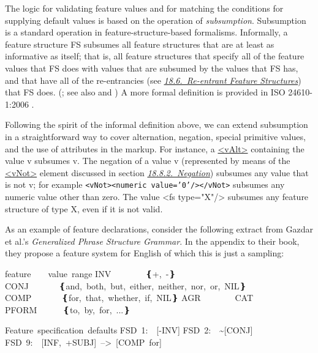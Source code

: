 \par
The logic for validating feature values and for matching the conditions for supplying default values is based on the operation of \textit{subsumption}. Subsumption is a standard operation in feature-structure-based formalisms. Informally, a feature structure  {\name FS} subsumes all feature structures that are at least as informative as itself; that is, all feature structures that specify all of the feature values that FS does with values that are subsumed by the values that FS has, and that have all of the re-entrancies (see \textit{\hyperref[FSVAR]{18.6.\ Re-entrant Feature Structures}}) that FS does. (\cite{FS-BIBL-5}; see also \cite{FS-BIBL-1} and \cite{FS-BIBL-2}) A more formal definition is provided in ISO 24610-1:2006 .\par
Following the spirit of the informal definition above, we can extend subsumption in a straightforward way to cover alternation, negation, special primitive values, and the use of attributes in the markup. For instance, a \hyperref[TEI.vAlt]{<vAlt>} containing the value v subsumes v. The negation of a value v (represented by means of the \hyperref[TEI.vNot]{<vNot>} element discussed in section \textit{\hyperref[FVNOT]{18.8.2.\ Negation}}) subsumes any value that is not v; for example \texttt{<vNot><numeric value='0'/></vNot>} subsumes any numeric value other than zero.  The value <fs type="X"/> subsumes any feature structure of type X, even if it is not valid.\par
As an example of feature declarations, consider the following extract from Gazdar et al.'s \textit{Generalized Phrase Structure Grammar}. In the appendix to their book, they propose a feature system for English of which this is just a sampling: \par\bgroup\exampleFont \begin{shaded}\noindent\mbox{}feature    value range\newline
INV        ❴+, -❵\newline
CONJ       ❴and, both, but, either, neither, nor, or, NIL❵\newline
COMP       ❴for, that, whether, if, NIL❵\newline
AGR        CAT\newline
PFORM      ❴to, by, for, ...❵\end{shaded}\egroup\par \noindent  \par\bgroup\exampleFont \begin{shaded}\noindent\mbox{}Feature specification defaults\newline
FSD 1:  [-INV]\newline
FSD 2:  \textasciitilde [CONJ]\newline
FSD 9:  [INF, +SUBJ] --> [COMP for]\end{shaded}\egroup\par \par
